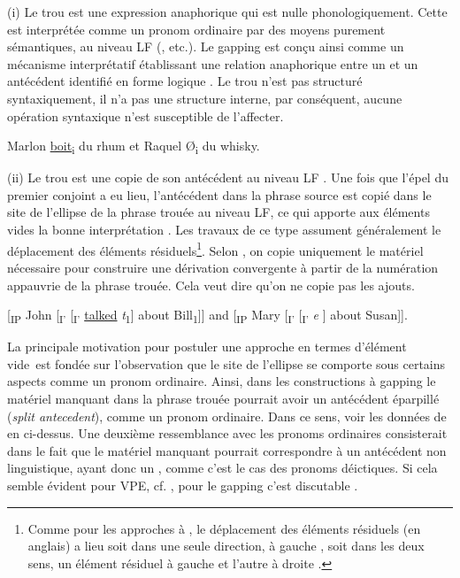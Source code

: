 (i) Le trou est une expression anaphorique qui est nulle phonologiquement. Cette  est interprétée comme un pronom ordinaire par des moyens purement sémantiques, au niveau LF (\citealt{Wasow1972,Williams1977,Williams1997,Zribi-Hertz1986}, etc.). Le gapping est conçu ainsi comme un mécanisme interprétatif établissant une relation anaphorique entre un  et un antécédent identifié en forme logique . Le trou n’est pas structuré syntaxiquement, {\cad} il n’a pas une structure interne, par conséquent, aucune opération syntaxique n’est susceptible de l’affecter. 

\ea \label{ch2:ex209}
Marlon \uline{boit}\textsubscript{i} du rhum et Raquel Ø\textsubscript{i} du whisky. \citep[398]{Zribi-Hertz1986}  
\z

(ii) Le trou est une copie de son antécédent au niveau LF . Une fois que l’épel du premier conjoint a eu lieu, l’antécédent dans la phrase source est copié dans le site de l’ellipse de la phrase trouée au niveau LF, ce qui apporte aux éléments vides la bonne interprétation \citep{AbeEtAl1997,AbeEtAl1999,Repp2009}. Les travaux de ce type assument généralement le déplacement des éléments résiduels\footnote{
 Comme pour les approches à , le déplacement des éléments résiduels (en anglais) a lieu soit dans une seule direction, à gauche \citep{Repp2009}, soit dans les deux sens, {\cad} un élément résiduel à gauche et l’autre à droite \citep{AbeEtAl1999}.}. Selon \citet{Repp2009}, on copie uniquement le matériel nécessaire pour construire une dérivation convergente à partir de la numération appauvrie de la phrase trouée. Cela veut dire qu’on ne copie pas les ajouts.

\ea {} [\textsubscript{IP} John [\textsubscript{I’} [\textsubscript{I’} \uline{talked} \textit{t}\textsubscript{1}] about Bill\textsubscript{1}]] and [\textsubscript{IP} Mary [\textsubscript{I’} [\textsubscript{I’} \textit{e} ] about Susan]]. \citep{AbeEtAl1999} \label{ch2:ex210} 
\z

La principale motivation pour postuler une approche en termes d’élément vide~est fondée sur l’observation que le site de l’ellipse se comporte sous certains aspects comme un pronom ordinaire. Ainsi, dans les constructions à gapping le matériel manquant dans la phrase trouée pourrait avoir un antécédent éparpillé (\textit{split antecedent}), comme un pronom ordinaire. Dans ce sens, voir les données de \citet{Coppock2001} en  ci-dessus. Une deuxième ressemblance avec les pronoms ordinaires consisterait dans le fait que le matériel manquant pourrait correspondre à un antécédent non linguistique, ayant donc un , comme c’est le cas des pronoms déictiques. Si cela semble évident pour VPE, cf. \citet{Lobeck1995}, pour le gapping c’est discutable \citep{HankamerEtAl1976}.


